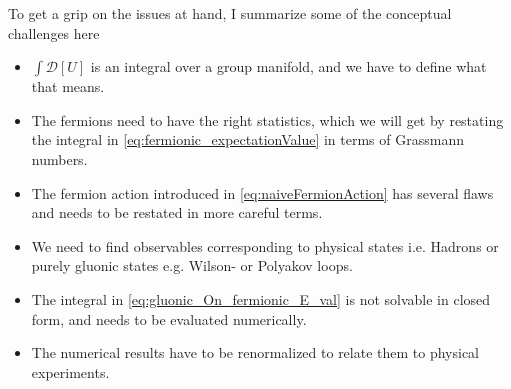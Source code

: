 \documentclass[a4paper,10pt]{article}
\begin{document}
 To get a grip on the issues at hand, I summarize some of the conceptual challenges here

\begin{itemize}
\item $\int \mathcal{D}[U]$ is an integral over a group manifold, and we have to define what that means.
\item The fermions need to have the right statistics, which we will get by restating the integral in \eqref{eq:fermionic_expectationValue} in terms of Grassmann numbers.
\item The fermion action introduced in \eqref{eq:naiveFermionAction} has several flaws and needs to be restated in more careful terms.
\item We need to find observables corresponding to physical states i.e. Hadrons or purely gluonic states e.g. Wilson- or Polyakov loops.
\item The integral in \eqref{eq:gluonic_On_fermionic_E_val} is not solvable in closed form, and needs to be evaluated numerically.
\item The numerical results have to be renormalized to relate them to physical experiments.
\end{itemize}
\end{document}
